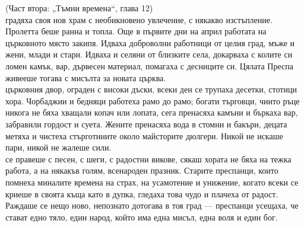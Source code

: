 \documentclass[12pt,a4paper]{article}
\begin{document}
\vspace{0.5cm}
(Част втора: „Тъмни времена“, глава 12)
\\
 градяха своя нов храм с необикновено увлечение, с някакво изстъпление. Пролетта беше ранна и топла. Още в първите дни на април работата на църковното място закипя. Идваха доброволни работници от целия град, мъже и жени, млади и стари. Идваха и селяни от близките села, докарваха с колите си ломен камък, вар, дървесен материал, помагаха с десниците си. Цялата Преспа живееше тогава с мисълта за новата църква.
\\
 църковния двор, ограден с високи дъски, всеки ден се трупаха десетки, стотици хора. Чорбаджии и бедняци работеха рамо до рамо; богати търговци, чиито ръце никога не бяха хващали копач или лопата, сега пренасяха камъни и бъркаха вар, забравили гордост и суета. Жените пренасяха вода в стомни и бакъри, децата метяха и чистеха стърготините около майсторите дюлгери. Никой не искаше пари, никой не жалеше сили.
\\
 се правеше с песен, с шеги, с радостни викове, сякаш хората не бяха на тежка работа, а на някакъв голям, всенароден празник. Старите преспанци, които помнеха миналите времена на страх, на усамотение и унижение, когато всеки се криеше в своята къща като в дупка, гледаха това чудо и плачеха от радост. Раждаше се нещо ново, непознато дотогава в тоя град — преспанци усещаха, че стават едно тяло, един народ, който има една мисъл, една воля и един бог.

\vspace{0.5cm}
\end{document}
